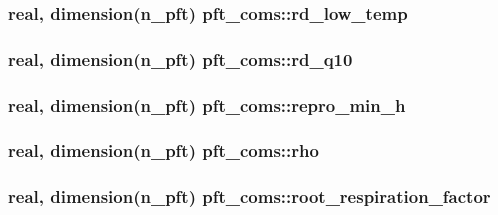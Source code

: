 \subsubsection[{\texorpdfstring{rd\+\_\+low\+\_\+temp}{rd_low_temp}}]{\setlength{\rightskip}{0pt plus 5cm}real, dimension(n\+\_\+pft) pft\+\_\+coms\+::rd\+\_\+low\+\_\+temp}\hypertarget{namespacepft__coms_ad26dff15166122932a2a576c592451ba}{}\label{namespacepft__coms_ad26dff15166122932a2a576c592451ba}
\subsubsection[{\texorpdfstring{rd\+\_\+q10}{rd_q10}}]{\setlength{\rightskip}{0pt plus 5cm}real, dimension(n\+\_\+pft) pft\+\_\+coms\+::rd\+\_\+q10}\hypertarget{namespacepft__coms_ac49f4aa4c8e6b1ab0c02f40ac0c443bd}{}\label{namespacepft__coms_ac49f4aa4c8e6b1ab0c02f40ac0c443bd}
\subsubsection[{\texorpdfstring{repro\+\_\+min\+\_\+h}{repro_min_h}}]{\setlength{\rightskip}{0pt plus 5cm}real, dimension(n\+\_\+pft) pft\+\_\+coms\+::repro\+\_\+min\+\_\+h}\hypertarget{namespacepft__coms_a30fe0a0ce90033d81e78cc82c9b70017}{}\label{namespacepft__coms_a30fe0a0ce90033d81e78cc82c9b70017}
\subsubsection[{\texorpdfstring{rho}{rho}}]{\setlength{\rightskip}{0pt plus 5cm}real, dimension(n\+\_\+pft) pft\+\_\+coms\+::rho}\hypertarget{namespacepft__coms_aec4095886699dcf26ce469d85c675ed5}{}\label{namespacepft__coms_aec4095886699dcf26ce469d85c675ed5}
\subsubsection[{\texorpdfstring{root\+\_\+respiration\+\_\+factor}{root_respiration_factor}}]{\setlength{\rightskip}{0pt plus 5cm}real, dimension(n\+\_\+pft) pft\+\_\+coms\+::root\+\_\+respiration\+\_\+factor}\hypertarget{namespacepft__coms_a3bc4fe17b80e40b1224d3e46d9699a66}{}\label{namespacepft__coms_a3bc4fe17b80e40b1224d3e46d9699a66}

